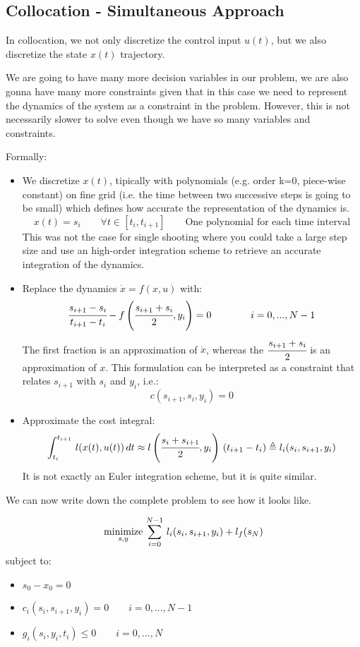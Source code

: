 \subsection{Collocation - Simultaneous Approach}
In collocation, we not only discretize the control input $u(t)$, but we also discretize the state $x(t)$ trajectory.

We are going to have many more decision variables in our problem, we are also gonna have many more constraints given that in this case we need to represent the dynamics of the system as a constraint in the problem.
However, this is not necessarily slower to solve even though we have so many variables and constraints.

Formally:
\begin{itemize}
\item We discretize $x(t)$, tipically with polynomials (e.g. order k=0, piece-wise constant) on fine grid (i.e. the time between two successive steps is going to be small) which defines how accurate the representation of the dynamics is.
\[x(t) = s_i\qquad\forall t \in [t_i, t_{i+1}]\qquad\text{One polynomial for each time interval}\]
This was not the case for single shooting where you could take a large step size and use an high-order integration scheme to retrieve an accurate integration of the dynamics.
\item Replace the dynamics $\dot{x} = f(x,u)$ with:
\[\cfrac{s_{i+1} - s_i}{t_{i+1} - t_i} - f\left(\cfrac{s_{i+1} + s_i}{2}, y_i\right) = 0\qquad\qquad i=0, ... , N-1\]
The first fraction is an approximation of $\dot{x}$, whereas the $\cfrac{s_{i+1} + s_i}{2}$ is an approximation of $x$.
This formulation can be interpreted as a constraint that relates $s_{i+1}$ with $s_i$ and $y_i$, i.e.:
\[c(s_{i+1}, s_i, y_i) = 0\]
\item Approximate the cost integral:
\[\int_{t_i}^{t_{i+1}}\,l(x(t), u(t))\,dt \approx l\left(\cfrac{s_i + s_{i+1}}{2}, y_i\right)\,(t_{i+1} - t_i) \triangleq l_i(s_i, s_{i+1}, y_i)\]
It is not exactly an Euler integration scheme, but it is quite similar.
\end{itemize}

We can now write down the complete problem to see how it looks like.

\[\operatorname*{minimize}_{s, y} \,\sum_{i=0}^{N-1}\,l_i(s_i, s_{i+1}, y_i) + l_f(s_N)\]
subject to:
\begin{itemize}
\item $s_0 - x_0 = 0$
\item $c_i(s_i, s_{i+1}, y_i) = 0\qquad i= 0, ..., N-1$
\item $g_i(s_i, y_i, t_i) \le 0\qquad i= 0, ..., N$ 
\end{itemize}

